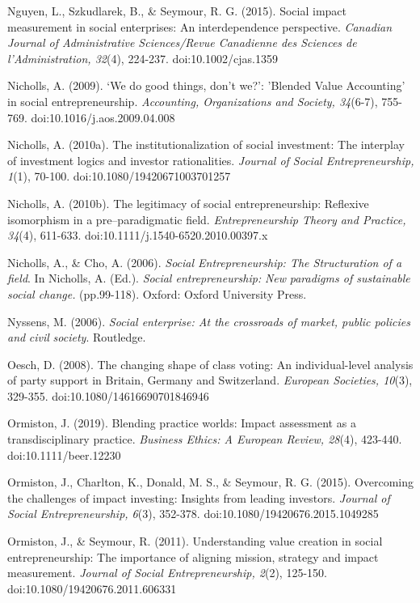 \documentclass{article}
\begin{document}
Nguyen, L., Szkudlarek, B., \& Seymour, R. G. (2015). Social impact measurement in social enterprises: An interdependence perspective. \emph{Canadian Journal of Administrative Sciences/Revue Canadienne des Sciences de }\emph{l'Administration}\emph{, 32}(4), 224-237. doi:10.1002/cjas.1359

Nicholls, A. (2009). ‘We do good things, don't we?': 'Blended Value Accounting' in social entrepreneurship. \emph{Accounting, Organizations and Society, 34}(6-7), 755-769. doi:10.1016/j.aos.2009.04.008

Nicholls, A. (2010a). The institutionalization of social investment: The interplay of investment logics and investor rationalities. \emph{Journal of Social Entrepreneurship, 1}(1), 70-100. doi:10.1080/19420671003701257

Nicholls, A. (2010b). The legitimacy of social entrepreneurship: Reflexive isomorphism in a pre--paradigmatic field. \emph{Entrepreneurship Theory and Practice, 34}(4), 611-633. doi:10.1111/j.1540-6520.2010.00397.x

Nicholls, A., \& Cho, A. (2006). \emph{Social Entrepreneurship: The Structuration of a field}. In Nicholls, A. (Ed.). \emph{Social entrepreneurship: }\emph{New}\emph{ paradigms of sustainable social change.} (pp.99-118). Oxford: Oxford University Press.

Nyssens, M. (2006). \emph{Social enterprise: At the crossroads of market, public policies and} \emph{civil} \emph{society}. Routledge. 

Oesch, D. (2008). The changing shape of class voting: An individual-level analysis of party support in Britain, Germany and Switzerland. \emph{European Societies, 10}(3), 329-355. doi:10.1080/14616690701846946

Ormiston, J. (2019). Blending practice worlds: Impact assessment as a transdisciplinary practice. \emph{Business Ethics: A European Review, 28}(4), 423-440. doi:10.1111/beer.12230 

Ormiston, J., Charlton, K., Donald, M. S., \& Seymour, R. G. (2015). Overcoming the challenges of impact investing: Insights from leading investors. \emph{Journal of Social Entrepreneurship, 6}(3), 352-378. doi:10.1080/19420676.2015.1049285

Ormiston, J., \& Seymour, R. (2011). Understanding value creation in social entrepreneurship: The importance of aligning mission, strategy and impact measurement. \emph{Journal of Social Entrepreneurship, 2}(2), 125-150. doi:10.1080/19420676.2011.606331
\end{document}

